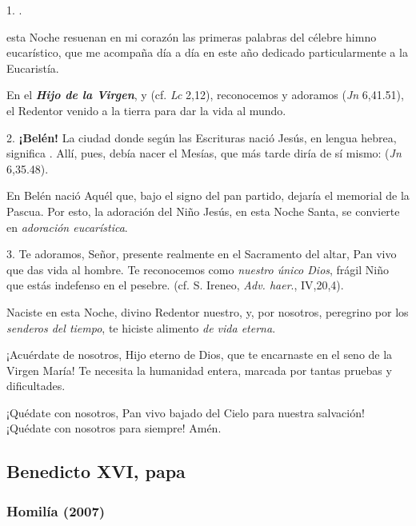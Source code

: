 \begin{body}
	1. .
	
	 esta Noche resuenan en mi corazón las primeras palabras del célebre himno eucarístico, que me acompaña día a día en este año dedicado particularmente a la Eucaristía.
	
	En el \emph{\textbf{Hijo de la Virgen}},  y  (cf. \emph{Lc} 2,12), reconocemos y adoramos  (\emph{Jn} 6,41.51), el Redentor venido a la tierra para dar la vida al mundo.
	
	2. \textbf{¡Belén!} La ciudad donde según las Escrituras nació Jesús, en lengua hebrea, significa . Allí, pues, debía nacer el Mesías, que más tarde diría de sí mismo:  (\emph{Jn} 6,35.48).
	
	En Belén nació Aquél que, bajo el signo del pan partido, dejaría el memorial de la Pascua. Por esto, la adoración del Niño Jesús, en esta Noche Santa, se convierte en \emph{adoración eucarística}.
	
	3. Te adoramos, Señor, presente realmente en el Sacramento del altar, Pan vivo que das vida al hombre. Te reconocemos como \emph{nuestro único Dios}, frágil Niño que estás indefenso en el pesebre.  (cf. S. Ireneo, \emph{Adv. haer}., IV,20,4).
	
	Naciste en esta Noche, divino Redentor nuestro, y, por nosotros, peregrino por los \emph{senderos del tiempo}, te hiciste alimento \emph{de vida eterna}.
	
	¡Acuérdate de nosotros, Hijo eterno de Dios, que te encarnaste en el seno de la Virgen María! Te necesita la humanidad entera, marcada por tantas pruebas y dificultades.
	
	¡Quédate con nosotros, Pan vivo bajado del Cielo para nuestra salvación! ¡Quédate con nosotros para siempre! Amén.
\end{body}

\newsection			

\subsection{Benedicto XVI, papa}

\subsubsection{Homilía (2007)}

